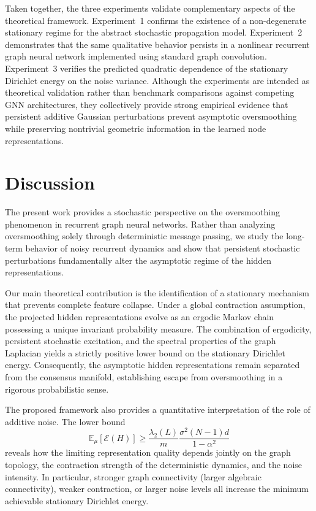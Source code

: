 \documentclass{article}
\begin{document}
Taken together, the three experiments validate complementary aspects of
the theoretical framework.
Experiment~1 confirms the existence of a non-degenerate stationary regime
for the abstract stochastic propagation model.
Experiment~2 demonstrates that the same qualitative behavior persists in a
nonlinear recurrent graph neural network implemented using standard graph
convolution.
Experiment~3 verifies the predicted quadratic dependence of the stationary
Dirichlet energy on the noise variance.
Although the experiments are intended as theoretical validation rather
than benchmark comparisons against competing GNN architectures, they
collectively provide strong empirical evidence that persistent additive
Gaussian perturbations prevent asymptotic oversmoothing while preserving
nontrivial geometric information in the learned node representations.


\section{Discussion}
\label{sec:Discussion}

The present work provides a stochastic perspective on the oversmoothing
phenomenon in recurrent graph neural networks.
Rather than analyzing oversmoothing solely through deterministic message
passing, we study the long-term behavior of noisy recurrent dynamics and
show that persistent stochastic perturbations fundamentally alter the
asymptotic regime of the hidden representations.

Our main theoretical contribution is the identification of a stationary
mechanism that prevents complete feature collapse.
Under a global contraction assumption, the projected hidden
representations evolve as an ergodic Markov chain possessing a unique
invariant probability measure.
The combination of ergodicity, persistent stochastic excitation, and the
spectral properties of the graph Laplacian yields a strictly positive
lower bound on the stationary Dirichlet energy.
Consequently, the asymptotic hidden representations remain separated from
the consensus manifold, establishing escape from oversmoothing in a
rigorous probabilistic sense.

The proposed framework also provides a quantitative interpretation of the
role of additive noise.
The lower bound
\[
\mathbb E_\mu[\mathcal E(H)]
\ge
\frac{\lambda_2(L)}{m}
\frac{\sigma^2(N-1)d}{1-\alpha^2}
\]
reveals how the limiting representation quality depends jointly on the
graph topology, the contraction strength of the deterministic dynamics,
and the noise intensity.
In particular, stronger graph connectivity (larger algebraic
connectivity), weaker contraction, or larger noise levels all increase
the minimum achievable stationary Dirichlet energy.
\end{document}
